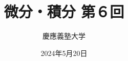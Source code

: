 \documentclass[dvipdfmx,cjk,10.2pt]{beamer}
\theoremstyle{definition}
\begin{document}
\title{微分・積分 第６回} 
\author{慶應義塾大学}            %
\date{2024年5月20日}
\maketitle

















\end{document}
